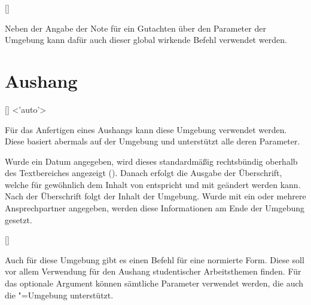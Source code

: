 \begin{DeclareEntity}{}
\begin{Declaration}
  {[]}
\printdeclarationlist

Neben der Angabe der Note für ein Gutachten über den Parameter 
 der Umgebung  
kann dafür auch dieser global wirkende Befehl verwendet werden.
\end{Declaration}


\section{Aushang}
%
%
\begin{Declaration}
  {[]}
  <'auto'>
\begin{Declaration}
  {}
\printdeclarationlist

Für das Anfertigen eines Aushangs kann diese Umgebung verwendet werden. Diese 
basiert abermals auf der Umgebung  und unterstützt alle 
deren Parameter.

Wurde ein Datum angegeben, wird dieses standardmäßig rechtsbündig oberhalb des 
Textbereiches angezeigt (). Danach 
erfolgt die Ausgabe der Überschrift, welche für gewöhnlich dem Inhalt von 
 entspricht und mit  
geändert werden kann. Nach der Überschrift folgt der Inhalt der Umgebung. Wurde 
mit  ein oder mehrere Ansprechpartner angegeben, werden 
diese Informationen am Ende der Umgebung gesetzt.
\end{Declaration}
\end{Declaration}

\begin{Declaration}
  {[\OList{}]}
\printdeclarationlist

Auch für diese Umgebung gibt es einen Befehl für eine normierte Form. Diese 
soll vor allem Verwendung für den Aushang studentischer Arbeitsthemen finden. 
Für das optionale Argument können sämtliche Parameter verwendet werden, die 
auch die "=Umgebung unterstützt.


\end{Declaration}
\end{DeclareEntity}
